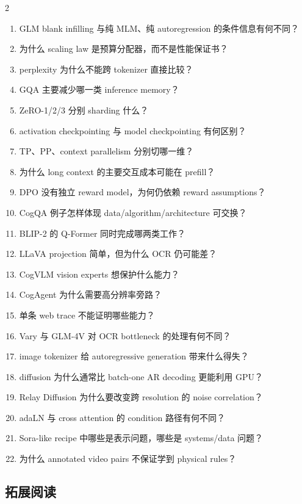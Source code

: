 \documentclass[a4paper]{article}
\begin{document}
\begin{multicols}{2}
\footnotesize
\begin{enumerate}
  \setlength{\itemsep}{0pt}
  \setlength{\parskip}{0pt}
  \item GLM blank infilling 与纯 MLM、纯 autoregression 的条件信息有何不同？
  \item 为什么 scaling law 是预算分配器，而不是性能保证书？
  \item perplexity 为什么不能跨 tokenizer 直接比较？
  \item GQA 主要减少哪一类 inference memory？
  \item ZeRO-1/2/3 分别 sharding 什么？
  \item activation checkpointing 与 model checkpointing 有何区别？
  \item TP、PP、context parallelism 分别切哪一维？
  \item 为什么 long context 的主要交互成本可能在 prefill？
  \item DPO 没有独立 reward model，为何仍依赖 reward assumptions？
  \item CogQA 例子怎样体现 data/algorithm/architecture 可交换？
  \item BLIP-2 的 Q-Former 同时完成哪两类工作？
  \item LLaVA projection 简单，但为什么 OCR 仍可能差？
  \item CogVLM vision experts 想保护什么能力？
  \item CogAgent 为什么需要高分辨率旁路？
  \item 单条 web trace 不能证明哪些能力？
  \item Vary 与 GLM-4V 对 OCR bottleneck 的处理有何不同？
  \item image tokenizer 给 autoregressive generation 带来什么得失？
  \item diffusion 为什么通常比 batch-one AR decoding 更能利用 GPU？
  \item Relay Diffusion 为什么要改变跨 resolution 的 noise correlation？
  \item adaLN 与 cross attention 的 condition 路径有何不同？
  \item Sora-like recipe 中哪些是表示问题，哪些是 systems/data 问题？
  \item 为什么 annotated video pairs 不保证学到 physical rules？
\end{enumerate}
\end{multicols}

\subsection{拓展阅读}
\end{document}
